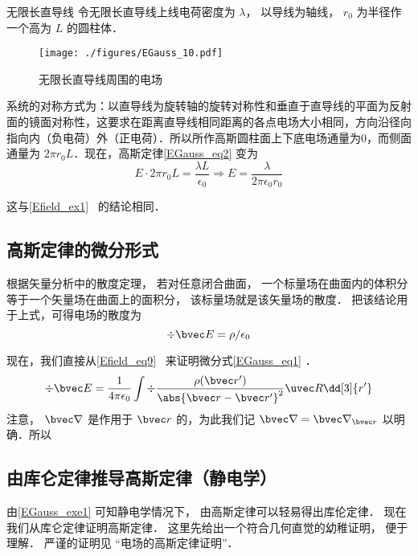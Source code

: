 \begin{example}{无限长直导线}
令无限长直导线上线电荷密度为 $\lambda$， 以导线为轴线， $r_0$ 为半径作一个高为 $L$ 的圆柱体． 
\begin{figure}[ht]
\centering
\texttt{[image: ./figures/EGauss\_10.pdf]}
\caption{无限长直导线周围的电场} \label{EGauss_fig10}
\end{figure}
系统的对称方式为：以直导线为旋转轴的旋转对称性和垂直于直导线的平面为反射面的镜面对称性，这要求在距离直导线相同距离的各点电场大小相同，方向沿径向指向内（负电荷）外（正电荷）．所以所作高斯圆柱面上下底电场通量为0，而侧面通量为 $2\pi r_0L$．现在，高斯定律\autoref{EGauss_eq2} 变为
\begin{equation}
E\cdot2\pi r_0L=\frac{\lambda L}{\epsilon_0}\Rightarrow E=\frac{\lambda}{2\pi \epsilon_0r_0 }
\end{equation}

这与\autoref{Efield_ex1}~ 的结论相同．
\end{example}

\subsection{高斯定律的微分形式}

根据矢量分析中的散度定理， 若对任意闭合曲面， 一个标量场在曲面内的体积分等于一个矢量场在曲面上的面积分， 该标量场就是该矢量场的散度． 把该结论用于上式，可得电场的散度为
\begin{equation}
\div \bvec E = \rho / \epsilon_0
\end{equation}

现在，我们直接从\autoref{Efield_eq9}~ 来证明微分式\autoref{EGauss_eq1} ．
\begin{equation}
\div \bvec E=\frac{1}{4\pi\epsilon_0}\int\div\frac{\rho(\bvec r')}{\abs{\bvec r-\bvec r'}^2}\uvec R\dd[3]{r'}
\end{equation}
注意， $\bvec\nabla$ 是作用于 $\bvec r$ 的，为此我们记 $\bvec\nabla=\bvec\nabla_{\bvec r}$ 以明确．所以
\begin{equation}
%
\end{equation}

\subsection{由库仑定律推导高斯定律（静电学）}
由\autoref{EGauss_exe1} 可知静电学情况下， 由高斯定律可以轻易得出库伦定律． 现在我们从库仑定律证明高斯定律． 这里先给出一个符合几何直觉的幼稚证明， 便于理解． 严谨的证明见 “电场的高斯定律证明”．

